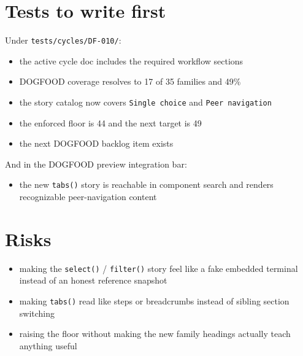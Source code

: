 \section{Tests to write first}\label{record-072-tests-to-write-first}

Under \texttt{t\allowbreak{}e\allowbreak{}s\allowbreak{}t\allowbreak{}s\allowbreak{}/\allowbreak{}c\allowbreak{}y\allowbreak{}c\allowbreak{}l\allowbreak{}e\allowbreak{}s\allowbreak{}/\allowbreak{}D\allowbreak{}F\allowbreak{}-\allowbreak{}0\allowbreak{}1\allowbreak{}0\allowbreak{}/}:

\begin{itemize}
\tightlist
\item
  the active cycle doc includes the required workflow sections
\item
  DOGFOOD coverage resolves to 17 of 35 families and 49\%
\item
  the story catalog now covers \texttt{S\allowbreak{}i\allowbreak{}n\allowbreak{}g\allowbreak{}l\allowbreak{}e\allowbreak{} \allowbreak{}c\allowbreak{}h\allowbreak{}o\allowbreak{}i\allowbreak{}c\allowbreak{}e} and \texttt{P\allowbreak{}e\allowbreak{}e\allowbreak{}r\allowbreak{} \allowbreak{}n\allowbreak{}a\allowbreak{}v\allowbreak{}i\allowbreak{}g\allowbreak{}a\allowbreak{}t\allowbreak{}i\allowbreak{}o\allowbreak{}n}
\item
  the enforced floor is 44 and the next target is 49
\item
  the next DOGFOOD backlog item exists
\end{itemize}

And in the DOGFOOD preview integration bar:

\begin{itemize}
\tightlist
\item
  the new \texttt{t\allowbreak{}a\allowbreak{}b\allowbreak{}s\allowbreak{}(\allowbreak{})} story is reachable in component search and renders recognizable peer-navigation content
\end{itemize}

\section{Risks}\label{record-072-risks}

\begin{itemize}
\tightlist
\item
  making the \texttt{s\allowbreak{}e\allowbreak{}l\allowbreak{}e\allowbreak{}c\allowbreak{}t\allowbreak{}(\allowbreak{})} / \texttt{f\allowbreak{}i\allowbreak{}l\allowbreak{}t\allowbreak{}e\allowbreak{}r\allowbreak{}(\allowbreak{})} story feel like a fake embedded terminal instead of an honest reference snapshot
\item
  making \texttt{t\allowbreak{}a\allowbreak{}b\allowbreak{}s\allowbreak{}(\allowbreak{})} read like steps or breadcrumbs instead of sibling section switching
\item
  raising the floor without making the new family headings actually teach anything useful
\end{itemize}

